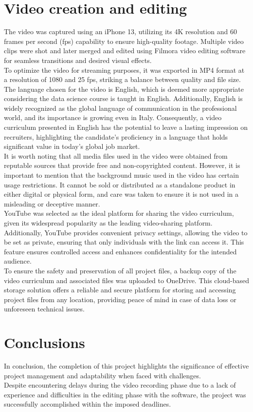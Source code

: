 \documentclass[eng]{class}
\begin{document}
\section{Video creation and editing}
The video was captured using an iPhone 13, utilizing its 4K resolution and 60 frames per second (fps) capability to ensure high-quality footage.
Multiple video clips were shot and later merged and edited using Filmora video editing software for seamless transitions and desired visual effects.\\
To optimize the video for streaming purposes, it was exported in MP4 format at a resolution of 1080 and 25 fps, striking a balance between quality and file size.\\
The language chosen for the video is English, which is deemed more appropriate considering the data science course is taught in English.
Additionally, English is widely recognized as the global language of communication in the professional world, and its importance is growing even in Italy.
Consequently, a video curriculum presented in English has the potential to leave a lasting impression on recruiters, highlighting the candidate's proficiency
in a language that holds significant value in today's global job market.\\
It is worth noting that all media files used in the video were obtained from reputable sources that provide free and non-copyrighted content.
However, it is important to mention that the background music used in the video has certain usage restrictions.
It cannot be sold or distributed as a standalone product in either digital or physical form, and care was taken to ensure
it is not used in a misleading or deceptive manner.\\
YouTube was selected as the ideal platform for sharing the video curriculum, given its widespread popularity as the leading video-sharing platform.
Additionally, YouTube provides convenient privacy settings, allowing the video to be set as private, ensuring that only individuals with the link can access it.
This feature ensures controlled access and enhances confidentiality for the intended audience.\\
To ensure the safety and preservation of all project files, a backup copy of the video curriculum and associated files was uploaded to OneDrive.
This cloud-based storage solution offers a reliable and secure platform for storing and accessing project files from any location,
providing peace of mind in case of data loss or unforeseen technical issues.\\

\section{Conclusions}
In conclusion, the completion of this project highlights
the significance of effective project management and adaptability when faced with challenges.\\
Despite encountering delays during the video recording phase due to a lack of experience and difficulties in the editing phase with the software,
the project was successfully accomplished within the imposed deadlines.
\end{document}
